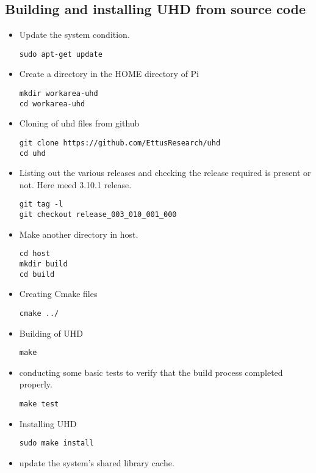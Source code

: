 \documentclass[journal,12pt,twocolumn]{IEEEtran}
\begin{document}
\subsection{Building and installing UHD from source code}
\begin{itemize}
%
\item Update the system condition.
\begin{lstlisting}
sudo apt-get update
\end{lstlisting}
%
\item Create a directory in the HOME directory of Pi
\begin{lstlisting}[frame=single]
mkdir workarea-uhd
cd workarea-uhd
\end{lstlisting}
%
\item Cloning of uhd files from github 
\begin{lstlisting}[frame=single]
git clone https://github.com/EttusResearch/uhd
cd uhd
\end{lstlisting}
%
\item Listing out the various releases and checking the release required is present or not. Here meed 3.10.1 release.
\begin{lstlisting}[frame=single]
git tag -l
git checkout release_003_010_001_000
\end{lstlisting}
\item Make another directory in host.
\begin{lstlisting}[frame=single]
cd host
mkdir build
cd build
\end{lstlisting}
%
\item Creating Cmake files 
\begin{lstlisting}[frame=single]
cmake ../
\end{lstlisting}
%
\item Building of UHD
\begin{lstlisting}[frame=single]
make 
\end{lstlisting}
%
\item conducting some basic tests to verify that the build process completed properly. 
\begin{lstlisting}[frame=single]
make test
\end{lstlisting}
%
\item Installing UHD
\begin{lstlisting}[frame=single]
sudo make install
\end{lstlisting}
%
\item  update the system's shared library cache.
\begin{lstlisting}[frame=single]

\end{lstlisting}
\end{itemize}
\end{document}
